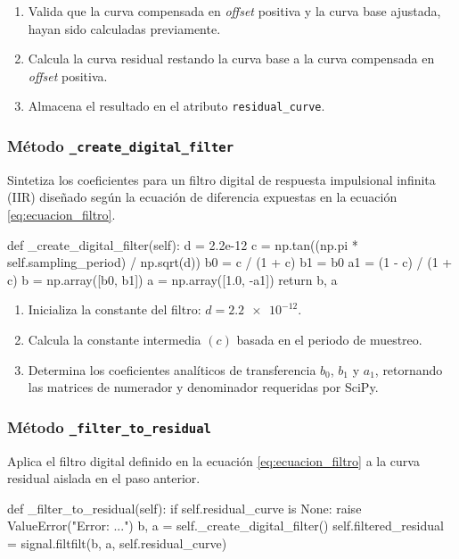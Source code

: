 \begin{enumerate}
    \item Valida que la curva compensada en \textit{offset} positiva y la curva base ajustada, hayan sido calculadas previamente.
    \item Calcula la curva residual restando la curva base a la curva compensada en \textit{offset} positiva.
    \item Almacena el resultado en el atributo \texttt{residual\_curve}.
\end{enumerate}

\subsubsection{Método \texttt{\_create\_digital\_filter}}
Sintetiza los coeficientes para un filtro digital de respuesta impulsional infinita (IIR) diseñado según la ecuación de diferencia expuestas en la ecuación \ref{eq:ecuacion_filtro}.

\begin{python}
def _create_digital_filter(self):
    d = 2.2e-12
    c = np.tan((np.pi * self.sampling_period) / np.sqrt(d))
    b0 = c / (1 + c)
    b1 = b0
    a1 = (1 - c) / (1 + c)
    b = np.array([b0, b1])
    a = np.array([1.0, -a1])
    return b, a
\end{python}

\begin{enumerate}
    \item Inicializa la constante del filtro: $d = \num{2,2e-12}$.
    \item Calcula la constante intermedia $(c)$ basada en el periodo de muestreo.
    \item Determina los coeficientes analíticos de transferencia $b_0$, $b_1$ y $a_1$, retornando las matrices de numerador y denominador requeridas por SciPy.
\end{enumerate}

\subsubsection{Método \texttt{\_filter\_to\_residual}}
Aplica el filtro digital definido en la ecuación \ref{eq:ecuacion_filtro} a la curva residual aislada en el paso anterior.

\begin{python}
def _filter_to_residual(self):
    if self.residual_curve is None:
        raise ValueError("Error: ...")
    b, a = self._create_digital_filter()
    self.filtered_residual = signal.filtfilt(b, a, self.residual_curve)
\end{python}

